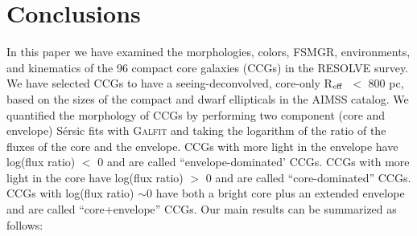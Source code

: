 \documentclass[iop,apj]{emulateapj}
\newcommand{\Reff}{R$_{\rm eff}$}
\newcommand{\Msun}{M$_{\odot}$}
\begin{document}

\section{Conclusions}
\label{conclusions}

  In this paper we have examined the morphologies, colors, FSMGR, environments, and kinematics of the 96 compact core galaxies (CCGs) in the RESOLVE survey. We have selected CCGs to have a seeing-deconvolved, core-only \Reff\ $<$ 800 pc, based on the sizes of the compact and dwarf ellipticals in the AIMSS catalog. We quantified the morphology of CCGs by performing two component (core and envelope) S\'ersic fits with \textsc{Galfit} and taking the logarithm of the ratio of the fluxes of the core and the envelope. CCGs with more light in the envelope have log(flux ratio) $<$ 0 and are called ``envelope-dominated' CCGs. CCGs with more light in the core have log(flux ratio) $>$ 0 and are called ``core-dominated'' CCGs. CCGs with log(flux ratio) $\sim 0$ have both a bright core plus an extended envelope and are called ``core+envelope'' CCGs. Our main results can be summarized as follows:
\end{document}
